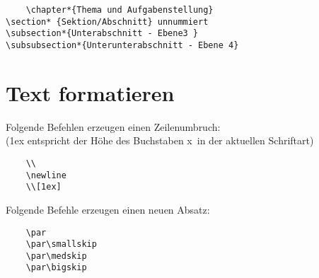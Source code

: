 \documentclass{like}
\begin{document}
\begin{minipage}{0.2\textwidth}
	\begin{verbatim}
	\chapter*{Thema und Aufgabenstellung}
\section* {Sektion/Abschnitt} unnummiert 
\subsection*{Unterabschnitt - Ebene3 } 
\subsubsection*{Unterunterabschnitt - Ebene 4}
\end{verbatim}
\end{minipage}


\section{Text formatieren}

Folgende Befehlen erzeugen einen Zeilenumbruch:\\ (1ex entspricht der Höhe des Buchstaben \glqq x\grqq\ in der aktuellen Schriftart)\par\medskip
\qquad\begin{minipage}{0.8\textwidth}
	\begin{verbatim}
	\\
	\newline
	\\[1ex]
	\end{verbatim}
\end{minipage}\par\bigskip

Folgende Befehle erzeugen einen neuen Absatz:

\qquad\begin{minipage}{0.8\textwidth}
	\begin{verbatim}
	\par
	\par\smallskip
	\par\medskip
	\par\bigskip
	\end{verbatim}
\end{minipage}\par\bigskip
\end{document}

